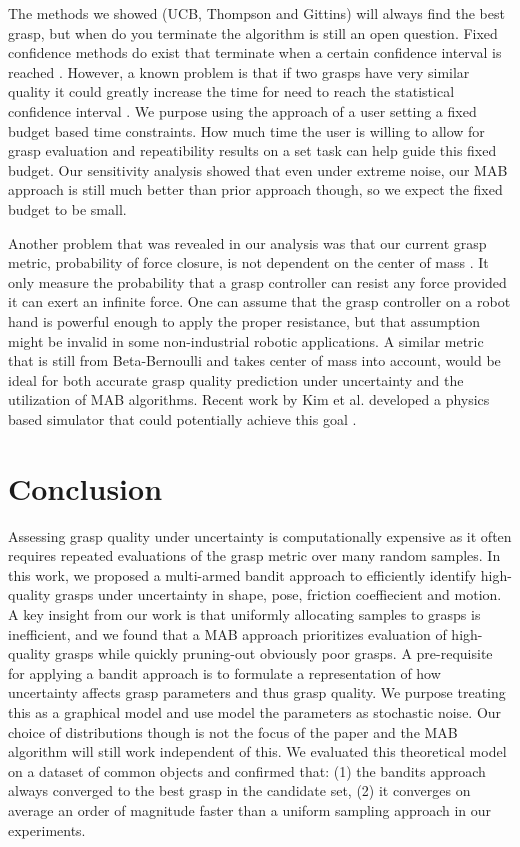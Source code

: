 \documentclass[journal,transmag]{IEEEtran}%
\begin{document}
The methods we showed (UCB, Thompson and Gittins) will always find the best grasp, but when do you terminate the algorithm is still an open question. Fixed confidence methods do exist that terminate when a certain confidence interval is reached \cite{maron1993hoeffding} \cite{mnih2008empirical}. However, a known problem is that if two grasps have very similar quality it could greatly increase the time for need to reach the statistical confidence interval \cite{audibert2010best}. We purpose using the approach of a user setting a fixed budget based  time constraints. How much time the user is willing to allow for grasp evaluation and repeatibility results on a set task can help guide this fixed budget. Our sensitivity analysis showed that even under extreme noise, our MAB approach is still much better than prior approach though, so we expect the fixed budget to be small. 

Another problem that was revealed in our analysis was that our current grasp metric, probability of force closure, is not dependent on the center of mass \cite{ferrari1992}. It only measure the probability that a grasp controller can resist any force provided it can exert an infinite force.  One can assume that the grasp controller on a robot hand is powerful enough to apply the proper resistance, but that assumption might be invalid in some non-industrial robotic applications. A similar metric that is still from Beta-Bernoulli and takes center of mass into account, would be ideal for both accurate grasp quality prediction under uncertainty and the utilization of MAB algorithms.  Recent work by Kim et al. developed a physics based simulator that could potentially achieve this goal \cite{kim2012physically}. 

\section{Conclusion}
Assessing grasp quality under  uncertainty is computationally expensive as it often requires repeated evaluations of the grasp metric over many random samples.
In this work, we proposed a multi-armed bandit approach to efficiently identify high-quality grasps under uncertainty in shape, pose, friction coeffiecient and motion. 
A key insight from our work is that uniformly allocating samples to grasps is inefficient, and
 we found that a MAB approach prioritizes evaluation of high-quality grasps while quickly pruning-out obviously poor grasps.
A pre-requisite for applying a bandit approach is to formulate a representation  of how uncertainty affects grasp parameters and thus grasp quality.
We purpose treating this as a graphical model and use model the parameters as stochastic noise. Our choice of distributions though is not the focus of the paper and the MAB algorithm will still work independent of this. 
We evaluated this theoretical model on a dataset of common objects and confirmed that: (1) the bandits approach always converged to the best grasp in the candidate set, (2) it converges on average an order of magnitude faster than a uniform sampling approach in our experiments.
\end{document}

